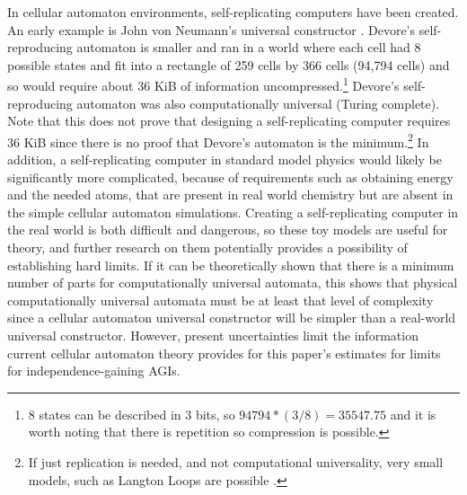 \documentclass[letterpaper,twocolumn]{article}
\begin{document}
In cellular automaton environments, self-replicating computers have
been created. An early example is John von Neumann's universal
constructor \citep{theoryofselfreproducingautomata}. Devore's
self-reproducing automaton is smaller and ran in a world where each
cell had 8 possible states and fit into a rectangle of 259 cells by
366 cells (94,794 cells) \citep{kozaartificiallife,devorecode} and so would
require about 36 KiB of information uncompressed.\footnote{8 states
can be described in 3 bits, so $94794*(3/8) = 35547.75$ and it is worth
noting that there is repetition so compression is possible.} Devore's
self-reproducing automaton was also computationally universal (Turing
complete). Note that this does not prove that designing a
self-replicating computer requires 36 KiB since there is no proof that
Devore's automaton is the minimum.\footnote{If just replication is
needed, and not computational universality, very small models, such as
Langton Loops are possible \citep{langton1984}.} In addition, a
self-replicating computer in standard model physics would likely be
significantly more complicated, because of requirements such as
obtaining energy and the needed atoms, that are present in real world
chemistry but are absent in the simple cellular automaton
simulations. Creating a self-replicating computer in the real world is
both difficult and dangerous, so these toy models are useful for
theory, and further research on them potentially provides a
possibility of establishing hard limits. If it can be theoretically
shown that there is a minimum number of parts for computationally
universal automata, this shows that physical computationally
universal automata must be at least that level of complexity since a cellular
automaton universal constructor will be simpler than a real-world
universal constructor. However, present uncertainties limit the
information current cellular automaton theory provides for this
paper's estimates for limits for independence-gaining AGIs.

\end{document}
